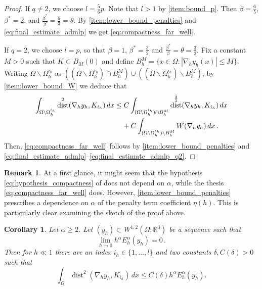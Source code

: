 \documentclass{article}
\theoremstyle{plain}
\theoremstyle{plain}
\newtheorem{cor}[teo]{Corollary}
\theoremstyle{plain}
\theoremstyle{plain}
\theoremstyle{plain}
\theoremstyle{definition}
\newtheorem{remark}[teo]{Remark}
\theoremstyle{definition}
\renewcommand{\r}{\mathbb{R}}
\DeclareMathOperator{\dist}{dist}
\begin{document}
\begin{proof}
    If $q \neq 2$, we choose $l = \frac{5}{6}p$. Note that $l > 1$ by \ref{item:bound_p}. Then $\beta = \frac{6}{5}$, $\beta^\ast = 2$, and $\frac{\beta^\ast}{\beta} = \frac{5}{3} = \theta$. By \ref{item:lower_bound_penalties} and \eqref{eq:final_estimate_admlp} we get \eqref{eq:compactness_far_well}.

    If $q = 2$, we choose $l = p$, so that $\beta = 1$, $\beta^\ast = \frac{3}{2}$ and $\frac{\beta^\ast}{\beta} = \theta = \frac{3}{2}$. 
    Fix a constant $M > 0$ such that $K \subset B_M(0)$ and define $B_h^M = \{x \in \Omega \colon |\nabla_h y_h(x)| \leq M\}$. Writing $\Omega \backslash \Omega_h^{i_h}$ as $((\Omega \backslash \Omega_h^{i_h}) \cap B_h^M) \cup ((\Omega \backslash \Omega_h^{i_h}) \backslash B_h^M)$, by \ref{item:lower_bound_W} we deduce that
    \begin{equation}\label{eq:final_estimate_admlp_q2}
        \begin{aligned}
            \int_{\Omega \backslash \Omega_h^{i_h}} \dist^2(\nabla_h y_h, K_{i_h}) \, dx & \leq C\int_{(\Omega \backslash \Omega_h^{i_h}) \cap B_h^M} \dist^{\frac{3}{2}}(\nabla_h y_h, K_{i_h}) \, dx \\
            & \hphantom{\geq} \, \, + C \int_{(\Omega \backslash \Omega_h^{i_h}) \backslash B_h^M} W(\nabla_h y_h) \, dx \,.
        \end{aligned}
    \end{equation}
    Then, \eqref{eq:compactness_far_well} follows by \ref{item:lower_bound_penalties} and \eqref{eq:final_estimate_admlp}--\eqref{eq:final_estimate_admlp_q2}.
\end{proof}

\begin{remark}
    At a first glance, it might seem that the hypothesis \eqref{eq:hypothesis_compactness} of  does not depend on $\alpha$, while the thesis \eqref{eq:compactness_far_well} does. However, \ref{item:lower_bound_penalties} prescribes a dependence on $\alpha$ of the penalty term coefficient $\eta(h)$. This is particularly clear examining the sketch of the proof above. 
\end{remark}

\begin{cor}\label{cor:compactness}
    Let $\alpha \geq 2$. Let $(y_h) \subset W^{1,2}(\Omega; \r^3)$ be a sequence such that
    \begin{equation}
        \lim_{h \to 0} h^\alpha E^\alpha_h(y_h) = 0 \,.
    \end{equation}
    Then for $h \ll 1$ there are an index $i_h \in \{1, \dots, l\}$ and two constants $\delta, C(\delta) > 0$ such that
    \begin{equation}
        \int_{\Omega} \dist^2(\nabla_h y_h, K_{i_h}) \, dx \leq C(\delta)h^\alpha E^\alpha_h(y_h).
    \end{equation}
\end{cor}
\end{document}
